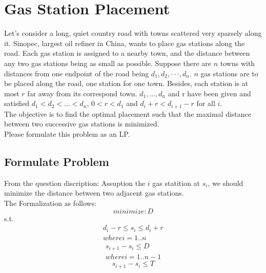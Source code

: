 \documentclass{article}
\numberwithin{equation}{section}
\begin{document}
\section{Gas Station Placement}
Let’s consider a long, quiet country road with towns scattered very sparsely
along it. Sinopec, largest oil refiner in China, wants to place gas stations along
the road. Each gas station is assigned to a nearby town, and the distance between any two gas stations being as small as possible. Suppose there are $n$
towns with distances from one endpoint of the road being $d_1,d_2, · · · ,d_n$. $n$ gas
stations are to be placed along the road, one station for one town. Besides, each
station is at most $r$ far away from its correspond town. $d_1,...,d_n$ and r have
been given and satisfied $d_1 < d_2 <...< d_n$, $0 < r < d_1$ and $d_i + r < d_{i+1} - r$
for all $i$. \\
The objective is to find the optimal placement such that the maximal distance between two successive gas stations is minimized.\\
Please formulate this problem as an LP.
\subsection{Formulate Problem}
From the question discription:
Assuption the $i$ gas statition at $s_i$, we should minimize the distance between two adjacent gas stations. \\
The Formalization as follows:
        \begin{equation}
             minimize: D
        \end{equation}
        s.t.
        \begin{equation}
        \begin{split}
             d_i - r \leq s_i \leq d_i + r    \\ where  i = 1.. n
        \end{split}
        \end{equation}
        \begin{equation}
        \begin{split}
             s_{i+1} - s_i \leq D       \\ where i = 1.. n-1
        \end{split}
        \end{equation}
        \begin{equation}
             s_{i+1} - s_i \leq T
        \end{equation}
\end{document}
